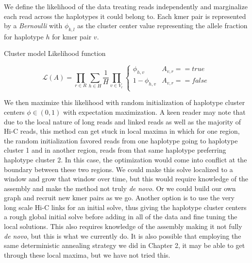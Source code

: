 We define the likelihood of the data treating reads independently and marginalize each read across the haplotypes it could belong to. Each kmer pair is represented by a \textit{Bernoulli} with $\phi_{k,l}$ as the cluster center value representing the allele fraction for haplotype $h$ for kmer pair $v$.

Cluster model Likelihood function

\begin{equation}
\mathcal{L}(A) = \prod_{r \in R} \sum_{h \in H} \frac{1}{H} \prod_{v \in V_r} \begin{cases}       \phi_{h,v} & A_{v,r} == true \\      1 - \phi_{h,v} & A_{v,r} == false \\
\end{cases}
\end{equation}

\par{
We then maximize this likelihood with random initialization of haplotype cluster centers $\phi \in (0,1)$ with expectation maximization. A keen reader may note that due to the local nature of long reads and linked reads as well as the majority of Hi-C reads, this method can get stuck in local maxima in which for one region, the random initialization favored reads from one haplotype going to haplotype cluster 1 and in another region, reads from that same haplotype preferring haplotype cluster 2. In this case, the optimization would come into conflict at the boundary between these two regions. We could make this solve localized to a window and grow that window over time, but this would require knowledge of the assembly and make the method not truly \textit{de novo}. Or we could build our own graph and recruit new kmer pairs as we go. Another option is to use the very long scale Hi-C links for an initial solve, thus giving the haplotype cluster centers a rough global initial solve before adding in all of the data and fine tuning the local solutions. This also requires knowledge of the assembly making it not fully \textit{de novo}, but this is what we currently do. It is also possible that employing the same deterministic annealing strategy we did in Chapter 2, it may be able to get through these local maxima, but we have not tried this.
}
